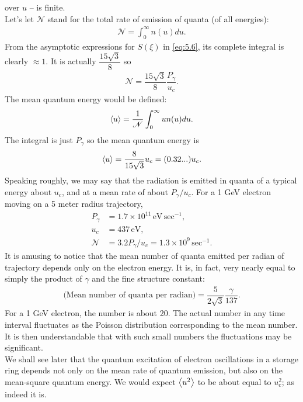  over $u$ -- is finite.\\
Let's let $\mathscr{N}$ stand for the total rate of emission of quanta (of all energies):
\begin{align}
	\mathscr{N} = \int_0^\infty n(u) du.
\end{align}
From the asymptotic expressions for $S(\xi)$ in \eqref{eq:5.6}, its complete integral
 is clearly $\approx 1$. It is actually $\dfrac{15\sqrt{3}}{8}$ so
\begin{align} \label{eq:5.12}
	\mathscr{N} = \dfrac{15\sqrt{3}}{8} \dfrac{P_\gamma}{u_c}.
\end{align}
The mean quantum energy would be defined:
\begin{align}
	\left< u \right> = \dfrac{1}{\mathscr{N}} \int_0^\infty u n(u) du.
\end{align}
The integral is just $P_\gamma$ so the mean quantum energy is
\begin{align}
	\left< u \right> = \dfrac{8}{15\sqrt{3}} u_c = (0.32...) u_c.
\end{align}
Speaking roughly, we may say that the radiation is emitted in quanta of a typical energy about $u_c$, and at a mean rate of about $P_\gamma/u_c$. For a 1 GeV electron moving on a 5 meter radius trajectory,
\begin{align*}
	P_\gamma &= 1.7 \times 10^{11}\, \text{eV}\,\text{sec}^{-1},\\
    u_c &= 437\, \text{eV},\\
    \mathscr{N} &= 3.2 P_\gamma / u_c = 1.3 \times 10^9\, \text{sec}^{-1}.
\end{align*}
It is amusing to notice that the mean number of quanta emitted per radian of trajectory depends only on the electron energy. It is, in fact, very nearly equal to simply the product of $\gamma$ and the fine structure constant:
\begin{align}
	\text{(Mean number of quanta per radian)} = \dfrac{5}{2\sqrt{3}} \dfrac{\gamma}{137}.
\end{align}
For a 1 GeV electron, the number is about 20. The actual number in any time interval fluctuates
 as the Poisson distribution corresponding to the mean number. It is then understandable
 that with such small numbers the fluctuations may be significant.\\
 We shall see later that the quantum excitation of electron oscillations in a storage ring depends not only on the mean rate of quantum emission, but also on the mean-square quantum energy. We would expect $\left< u^2 \right>$ to be about equal to $u_c^2$; as indeed it is.
